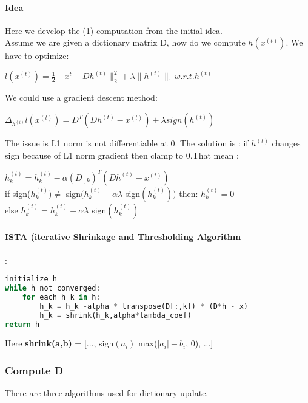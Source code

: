 \documentclass[a4paper,10pt]{article}
\begin{document}
\paragraph{Idea}
Here we develop the (1) computation  from the initial idea.\\
Assume we are given a dictionary matrix D, how do we compute $h(x^{(t)})$. We have to optimize:
\begin{center}
$l(x^{(t)}) = \frac{1}{2} \| x^{t}- D h^{(t)} \|^{2}_{2} + \lambda \|h^{(t)}\|_1 w.r.t. h^{(t)}$\\ 
\end{center}
We could use a gradient descent method:\\
\begin{center}
$\Delta_{h^{(t)}} l(x^{(t)}) = D^T (D h^{(t)} - x^{(t)}) + \lambda sign(h^{(t)})$
\end{center}
The issue is L1 norm is not differentiable at 0. The solution is : if $h^(t)$ changes sign because of L1 norm gradient then clamp to 0.That mean :

$h^{(t)}_k = h^{(t)}_k   - \alpha (D_{., k})^T (D h^{(t)} - x^{(t)})$\\
\indent if  sign($h^{(t)}_k) \neq$ sign$(h^{(t)}_k - \alpha \lambda$ sign$(h^{(t)}_k) )$ then: $h^{(t)}_k = 0$\\
\indent else $h^{(t)}_k = h^{(t)}_k - \alpha \lambda$ sign$(h^{(t)}_k)$
\paragraph{ISTA (iterative Shrinkage and Thresholding Algorithm}
:
\begin{lstlisting}[language=Python,frame=single]
initialize h 
while h not_converged:
    for each h_k in h:
        h_k = h_k -alpha * transpose(D[:,k]) * (D*h - x)
        h_k = shrink(h_k,alpha*lambda_coef)
return h
\end{lstlisting}
Here \textbf{shrink(a,b) }= [..., sign$(a_i)$ max($|a_i| - b_i$, 0), ...]\\

\subsubsection{Compute D}
There are three algorithms used for  dictionary update.
\end{document}
